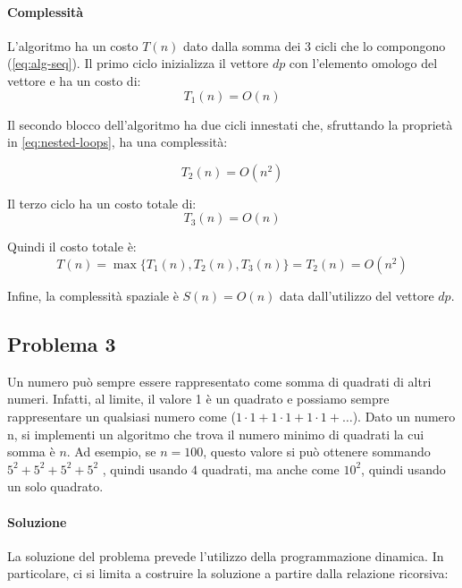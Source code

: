 \documentclass{article}
\begin{document}
\paragraph{Complessità} 
L'algoritmo ha un costo $T(n)$ dato dalla somma dei 3 cicli che lo compongono (\cref{eq:alg-seq}). Il primo ciclo inizializza il vettore $dp$ con l'elemento omologo del vettore e ha un costo di: 
\begin{equation*}
    T_1(n) = O(n)
\end{equation*}

Il secondo blocco dell'algoritmo ha due cicli innestati che, sfruttando la proprietà in \cref{eq:nested-loops}, ha una complessità:

\begin{equation*}
    T_2(n) = O(n^2)
\end{equation*}

Il terzo ciclo ha un costo totale di:
\begin{equation*}
    T_3(n) = O(n)
\end{equation*}

Quindi il costo totale è:
\begin{equation*}
    T(n) = \max\{T_1(n), T_2(n), T_3(n)\} = T_2(n) = O(n^2)
\end{equation*}

Infine, la complessità spaziale è $S(n) = O(n)$ data dall'utilizzo del vettore $dp$.
\clearpage

\subsection{Problema 3}
Un numero può sempre essere rappresentato come somma di quadrati di altri numeri.
Infatti, al limite, il valore 1 è un quadrato e possiamo sempre rappresentare un qualsiasi
numero come ($1\cdot 1 + 1\cdot 1 + 1\cdot 1 + \dots$).
Dato un numero n, si implementi un algoritmo che trova il numero minimo di quadrati la cui
somma è $n$. Ad esempio, se $n = 100$, questo valore si può ottenere sommando $5^2 + 5^2 + 5^2 + 5^2$ , quindi usando $4$ quadrati, ma anche come $10^2$, quindi usando un solo quadrato.

\paragraph{Soluzione}
La soluzione del problema prevede l'utilizzo della programmazione dinamica. In particolare, ci si limita a costruire la soluzione a partire dalla relazione ricorsiva:
\end{document}
